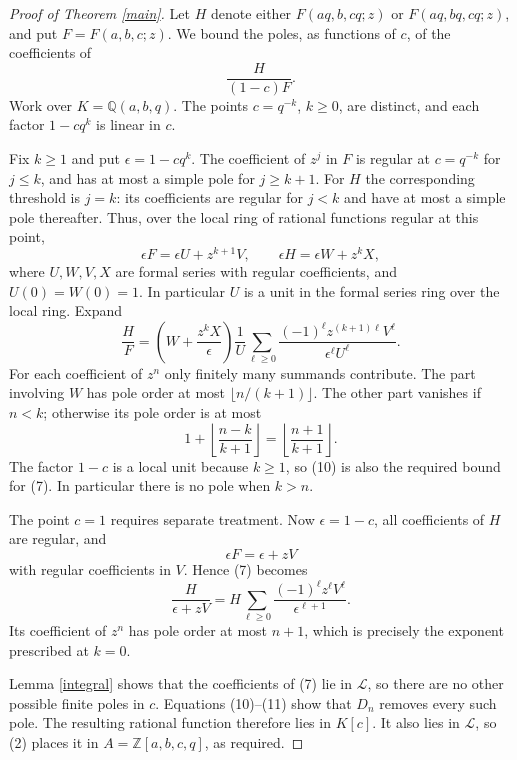 \documentclass[10pt]{article}
\newcommand{\Z}{\mathbb Z}
\newcommand{\Q}{\mathbb Q}
\begin{document}
\begin{proof}[Proof of Theorem \ref{main}]
Let $H$ denote either $F(aq,b,cq;z)$ or $F(aq,bq,cq;z)$,
and put $F=F(a,b,c;z)$. We bound the poles, as functions of $c$,
of the coefficients of
\[
 \frac{H}{(1-c)F}.                                      \tag{7}
\]
Work over $K=\Q(a,b,q)$. The points $c=q^{-k}$, $k\ge0$, are
distinct, and each factor $1-cq^k$ is linear in $c$.

Fix $k\ge1$ and put $\epsilon=1-cq^k$.
The coefficient of $z^j$ in $F$ is regular at $c=q^{-k}$ for
$j\le k$, and has at most a simple pole for $j\ge k+1$.
For $H$ the corresponding threshold is $j=k$: its coefficients
are regular for $j<k$ and have at most a simple pole thereafter.
Thus, over the local ring of rational functions regular at this point,
\[
 \epsilon F=\epsilon U+z^{k+1}V,\qquad
 \epsilon H=\epsilon W+z^kX,                             \tag{8}
\]
where $U,W,V,X$ are formal series with regular coefficients,
and $U(0)=W(0)=1$. In particular $U$ is a unit in the formal
series ring over the local ring. Expand
\[
 \frac HF=
 \left(W+\frac{z^kX}{\epsilon}\right)\frac1U
 \sum_{\ell\ge0}
       \frac{(-1)^\ell z^{(k+1)\ell}V^\ell}
                            {\epsilon^\ell U^\ell}.     \tag{9}
\]
For each coefficient of $z^n$ only finitely many summands contribute.
The part involving $W$ has pole order at most
$\lfloor n/(k+1)\rfloor$. The other part vanishes if $n<k$;
otherwise its pole order is at most
\[
 1+\left\lfloor\frac{n-k}{k+1}\right\rfloor
   =\left\lfloor\frac{n+1}{k+1}\right\rfloor.             \tag{10}
\]
The factor $1-c$ is a local unit because $k\ge1$, so (10) is
also the required bound for (7). In particular there is no pole
when $k>n$.

The point $c=1$ requires separate treatment. Now
$\epsilon=1-c$, all coefficients of $H$ are regular, and
\[
 \epsilon F=\epsilon+zV
\]
with regular coefficients in $V$. Hence (7) becomes
\[
 \frac{H}{\epsilon+zV}
   =H\sum_{\ell\ge0}\frac{(-1)^\ell z^\ell V^\ell}
                           {\epsilon^{\ell+1}}.         \tag{11}
\]
Its coefficient of $z^n$ has pole order at most $n+1$,
which is precisely the exponent prescribed at $k=0$.

Lemma \ref{integral} shows that the coefficients of (7) lie in
$\mathcal L$, so there are no other possible finite poles in $c$.
Equations (10)--(11) show that $D_n$ removes every such pole.
The resulting rational function therefore lies in $K[c]$.
It also lies in $\mathcal L$, so (2) places it in
$A=\Z[a,b,c,q]$, as required.
\end{proof}
\end{document}
